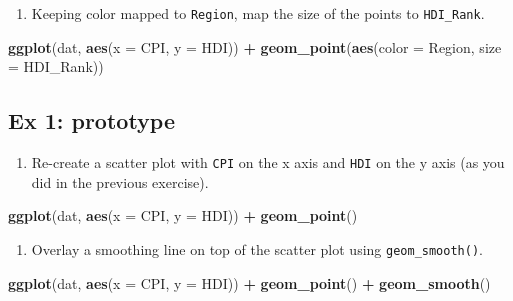 \documentclass[]{book}
\newenvironment{Shaded}{\begin{snugshade}}{\end{snugshade}}
\newcommand{\KeywordTok}[1]{\textcolor[rgb]{0.13,0.29,0.53}{\textbf{#1}}}
\newcommand{\DataTypeTok}[1]{\textcolor[rgb]{0.13,0.29,0.53}{#1}}
\newcommand{\StringTok}[1]{\textcolor[rgb]{0.31,0.60,0.02}{#1}}
\newcommand{\OperatorTok}[1]{\textcolor[rgb]{0.81,0.36,0.00}{\textbf{#1}}}
\newcommand{\NormalTok}[1]{#1}
\providecommand{\tightlist}{%
  \setlength{\itemsep}{0pt}\setlength{\parskip}{0pt}}
\begin{document}
\begin{enumerate}
\def\labelenumi{\arabic{enumi}.}
\setcounter{enumi}{4}
\tightlist
\item
  Keeping color mapped to \texttt{Region}, map the size of the points to
  \texttt{HDI\_Rank}.
\end{enumerate}

\begin{Shaded}
\begin{Highlighting}[]
\KeywordTok{ggplot}\NormalTok{(dat, }\KeywordTok{aes}\NormalTok{(}\DataTypeTok{x =}\NormalTok{ CPI, }\DataTypeTok{y =}\NormalTok{ HDI)) }\OperatorTok{+}
\KeywordTok{geom_point}\NormalTok{(}\KeywordTok{aes}\NormalTok{(}\DataTypeTok{color =}\NormalTok{ Region, }\DataTypeTok{size =}\NormalTok{  HDI_Rank))}
\end{Highlighting}
\end{Shaded}

\subsection{Ex 1: prototype}\label{ex-1-prototype-2}

\begin{enumerate}
\def\labelenumi{\arabic{enumi}.}
\tightlist
\item
  Re-create a scatter plot with \texttt{CPI} on the x axis and
  \texttt{HDI} on the y axis (as you did in the previous exercise).
\end{enumerate}

\begin{Shaded}
\begin{Highlighting}[]
\KeywordTok{ggplot}\NormalTok{(dat, }\KeywordTok{aes}\NormalTok{(}\DataTypeTok{x =}\NormalTok{ CPI, }\DataTypeTok{y =}\NormalTok{ HDI)) }\OperatorTok{+}
\StringTok{  }\KeywordTok{geom_point}\NormalTok{()}
\end{Highlighting}
\end{Shaded}

\begin{enumerate}
\def\labelenumi{\arabic{enumi}.}
\setcounter{enumi}{1}
\tightlist
\item
  Overlay a smoothing line on top of the scatter plot using
  \texttt{geom\_smooth()}.
\end{enumerate}

\begin{Shaded}
\begin{Highlighting}[]
\KeywordTok{ggplot}\NormalTok{(dat, }\KeywordTok{aes}\NormalTok{(}\DataTypeTok{x =}\NormalTok{ CPI, }\DataTypeTok{y =}\NormalTok{ HDI)) }\OperatorTok{+}
\StringTok{  }\KeywordTok{geom_point}\NormalTok{() }\OperatorTok{+}
\StringTok{  }\KeywordTok{geom_smooth}\NormalTok{()}
\end{Highlighting}
\end{Shaded}
\end{document}
